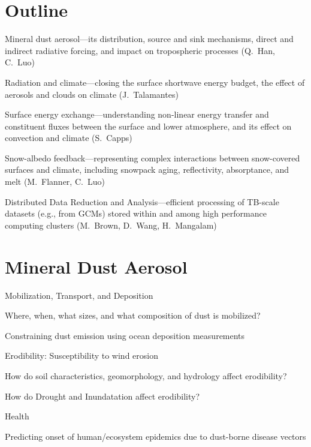 \documentclass[12pt]{article}
\begin{document}
\section[Outline]{Outline}
\begin{enumerate*}
\item Mineral dust aerosol---its distribution, source and sink
  mechanisms, direct and indirect radiative forcing, and impact on
  tropospheric processes (Q.~Han, C.~Luo)

\item Radiation and climate---closing the surface shortwave energy
  budget, the effect of aerosols and clouds on climate (J.~Talamantes) 

\item Surface energy exchange---understanding non-linear energy
  transfer and constituent fluxes between the surface and lower
  atmosphere, and its effect on convection and climate (S.~Capps) 

\item Snow-albedo feedback---representing complex interactions
  between snow-covered surfaces and climate, including snowpack aging,
  reflectivity, absorptance, and melt (M.~Flanner, C.~Luo)

\item Distributed Data Reduction and Analysis---efficient processing
  of TB-scale datasets (e.g., from GCMs) stored within and among high
  performance computing clusters (M.~Brown, D.~Wang, H.~Mangalam)
\end{enumerate*}
\clearpage

\Large
\section[Mineral Dust Aerosol]{Mineral Dust Aerosol}
\begin{enumerate*}
\item Mobilization, Transport, and Deposition
\begin{enumerate*}
\item Where, when, what sizes, and what composition of dust is mobilized?
\item Constraining dust emission using ocean deposition measurements
\end{enumerate*}
\item Erodibility: Susceptibility to wind erosion
\begin{enumerate*}
\item How do soil characteristics, geomorphology, and hydrology affect erodibility?
\item How do Drought and Inundatation affect erodibility?
\end{enumerate*}
\item Health
\begin{enumerate*}
\item Predicting onset of human/ecosystem epidemics due to dust-borne
  disease vectors 
\end{enumerate*}
\end{enumerate*}
\clearpage
\end{document}
